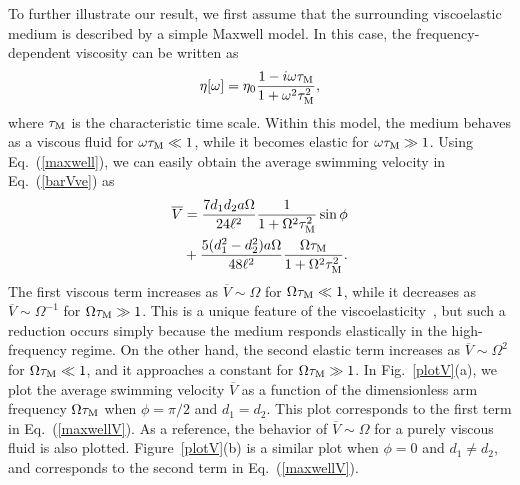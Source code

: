 \documentclass[nofootinbib,twocolumn,showpacs,preprintnumbers,pre,aps]{revtex4-1}
\begin{document}
To further illustrate our result, we first assume that the surrounding viscoelastic medium 
is described by a simple Maxwell model.  
In this case, the frequency-dependent viscosity can be written as 
\begin{equation}
\eta[\omega]=\eta_0\frac{1-i\omega\tau_{\rm M}}{1+\omega^2\tau_{\rm M}^2}, 
\label{maxwell}
\end{equation}
where $\tau_{\rm M}$ is the characteristic time scale.
Within this model, the medium behaves as a viscous fluid for $\omega\tau_{\rm M} \ll 1$, 
while it becomes elastic for $\omega\tau_{\rm M} \gg 1$.
Using Eq.~(\ref{maxwell}), we can easily obtain the average swimming velocity in 
Eq.~(\ref{barVve}) as 
\begin{align}
\overline{V}& =\frac{7d_1d_2a\Omega}{24\ell^2}\frac{1}{1+\Omega^2\tau_{\rm M}^2}
\sin \phi \nonumber \\
& +\frac{5(d_1^2-d_2^2)a\Omega}{48\ell^2}
\frac{\Omega\tau_{\rm M}}{1+\Omega^2\tau_{\rm M}^2}.
\label{maxwellV}
\end{align}
The first viscous term increases as $\overline{V} \sim \Omega$ for $\Omega \tau_{\rm M} \ll 1$,
while it decreases as $\overline{V} \sim \Omega^{-1}$ for $\Omega \tau_{\rm M} \gg 1$.
This is a unique feature of the viscoelasticity~\cite{Lauga092,Fu07,Fu09},
but such a reduction occurs simply because the medium responds elastically in the 
high-frequency regime. 
On the other hand, the second elastic term increases as 
$\overline{V} \sim \Omega^2$ for $\Omega \tau_{\rm M} \ll 1$, and it approaches a constant 
for $\Omega \tau_{\rm M} \gg 1$.
In Fig.~\ref{plotV}(a), we plot the average swimming velocity $\overline{V}$ as a function 
of the dimensionless arm frequency $\Omega \tau_{\rm M}$ when 
$\phi=\pi/2$ and $d_1=d_2$. 
This plot corresponds to the first term in Eq.~(\ref{maxwellV}).
As a reference, the behavior of $\overline{V} \sim\Omega$ for a purely viscous fluid 
is also plotted.
Figure~\ref{plotV}(b) is a similar plot when $\phi=0$ and $d_1 \ne d_2$, and corresponds 
to the second term in Eq.~(\ref{maxwellV}).
\end{document}
